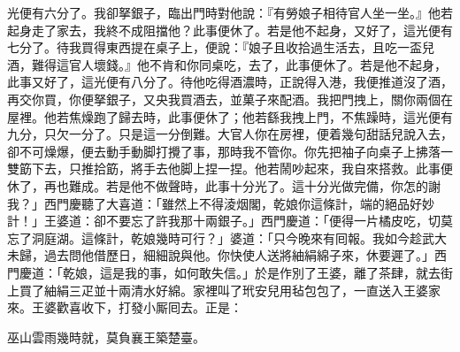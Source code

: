 光便有六分了。我卻拏銀子，臨出門時對他說：{}『有勞娘子相待官人坐一坐。』他若起身走了家去，我終不成阻擋他？此事便休了。若是他不起身，又好了，這光便有七分了。待我買得東西提在桌子上，便說：『娘子且收拾過生活去，且吃一盃兒酒，難得這官人壞錢。』他不肯和你同桌吃，去了，此事便休了。若是他不起身，此事又好了，這光便有八分了。待他吃得酒濃時，正說得入港，我便推道沒了酒，再交你買，你便拏銀子，又央我買酒去，並菓子來配酒。我把門拽上，關你兩個在屋裡。他若焦燥跑了歸去時，此事便休了；他若繇我拽上門，不焦躁時，這光便有九分，只欠一分了。只是這一分倒難。大官人你在房裡，便着幾句甜話兒說入去，卻不可燥爆，便去動手動脚打攪了事，那時我不管你。你先把袖子向桌子上拂落一雙筯下去，只推拾筯，將手去他脚上捏一捏。他若鬧吵起來，我自來搭救。此事便休了，再也難成。若是他不做聲時，此事十分光了。這十分光做完備，你怎的謝我？」西門慶聽了大喜道：「雖然上不得淩烟閣，乾娘你這條計，端的絕品好妙計！」王婆道：卻不要忘了許我那十兩銀子。」{}西門慶道：「便得一片橘皮吃，切莫忘了洞庭湖。這條計，乾娘幾時可行？」婆道：「只今晚來有囘報。我如今趁武大未歸，過去問他借歷日，細細說與他。你快使人送將紬絹綿子來，休要遲了。」西門慶道：「乾娘，這是我的事，如何敢失信。」於是作別了王婆，離了茶肆，就去街上買了紬絹三疋並十兩清水好綿。家裡叫了玳安兒用毡包包了，一直送入王婆家來。王婆歡喜收下，打發小厮囘去。正是：

巫山雲雨幾時就，莫負襄王築楚臺。

